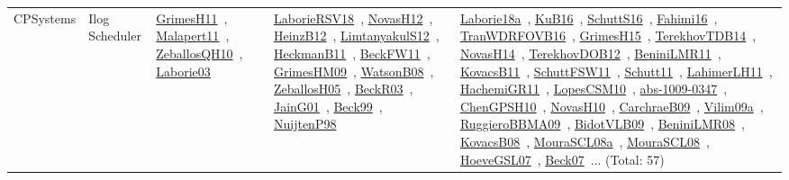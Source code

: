 {\begin{longtable}{lp{3cm}>{\raggedright\arraybackslash}p{6cm}>{\raggedright\arraybackslash}p{6cm}>{\raggedright\arraybackslash}p{8cm}}
CPSystems & Ilog Scheduler & \href{works/GrimesH11.pdf}{GrimesH11}~\cite{GrimesH11}, \href{works/Malapert11.pdf}{Malapert11}~\cite{Malapert11}, \href{works/ZeballosQH10.pdf}{ZeballosQH10}~\cite{ZeballosQH10}, \href{works/Laborie03.pdf}{Laborie03}~\cite{Laborie03} & \href{works/LaborieRSV18.pdf}{LaborieRSV18}~\cite{LaborieRSV18}, \href{works/NovasH12.pdf}{NovasH12}~\cite{NovasH12}, \href{works/HeinzB12.pdf}{HeinzB12}~\cite{HeinzB12}, \href{works/LimtanyakulS12.pdf}{LimtanyakulS12}~\cite{LimtanyakulS12}, \href{works/HeckmanB11.pdf}{HeckmanB11}~\cite{HeckmanB11}, \href{works/BeckFW11.pdf}{BeckFW11}~\cite{BeckFW11}, \href{works/GrimesHM09.pdf}{GrimesHM09}~\cite{GrimesHM09}, \href{works/WatsonB08.pdf}{WatsonB08}~\cite{WatsonB08}, \href{works/ZeballosH05.pdf}{ZeballosH05}~\cite{ZeballosH05}, \href{works/BeckR03.pdf}{BeckR03}~\cite{BeckR03}, \href{works/JainG01.pdf}{JainG01}~\cite{JainG01}, \href{works/Beck99.pdf}{Beck99}~\cite{Beck99}, \href{works/NuijtenP98.pdf}{NuijtenP98}~\cite{NuijtenP98} & \href{works/Laborie18a.pdf}{Laborie18a}~\cite{Laborie18a}, \href{works/KuB16.pdf}{KuB16}~\cite{KuB16}, \href{works/SchuttS16.pdf}{SchuttS16}~\cite{SchuttS16}, \href{works/Fahimi16.pdf}{Fahimi16}~\cite{Fahimi16}, \href{works/TranWDRFOVB16.pdf}{TranWDRFOVB16}~\cite{TranWDRFOVB16}, \href{works/GrimesH15.pdf}{GrimesH15}~\cite{GrimesH15}, \href{works/TerekhovTDB14.pdf}{TerekhovTDB14}~\cite{TerekhovTDB14}, \href{works/NovasH14.pdf}{NovasH14}~\cite{NovasH14}, \href{works/TerekhovDOB12.pdf}{TerekhovDOB12}~\cite{TerekhovDOB12}, \href{works/BeniniLMR11.pdf}{BeniniLMR11}~\cite{BeniniLMR11}, \href{works/KovacsB11.pdf}{KovacsB11}~\cite{KovacsB11}, \href{works/SchuttFSW11.pdf}{SchuttFSW11}~\cite{SchuttFSW11}, \href{works/Schutt11.pdf}{Schutt11}~\cite{Schutt11}, \href{works/LahimerLH11.pdf}{LahimerLH11}~\cite{LahimerLH11}, \href{works/HachemiGR11.pdf}{HachemiGR11}~\cite{HachemiGR11}, \href{works/LopesCSM10.pdf}{LopesCSM10}~\cite{LopesCSM10}, \href{works/abs-1009-0347.pdf}{abs-1009-0347}~\cite{abs-1009-0347}, \href{works/ChenGPSH10.pdf}{ChenGPSH10}~\cite{ChenGPSH10}, \href{works/NovasH10.pdf}{NovasH10}~\cite{NovasH10}, \href{works/CarchraeB09.pdf}{CarchraeB09}~\cite{CarchraeB09}, \href{works/Vilim09a.pdf}{Vilim09a}~\cite{Vilim09a}, \href{works/RuggieroBBMA09.pdf}{RuggieroBBMA09}~\cite{RuggieroBBMA09}, \href{works/BidotVLB09.pdf}{BidotVLB09}~\cite{BidotVLB09}, \href{works/BeniniLMR08.pdf}{BeniniLMR08}~\cite{BeniniLMR08}, \href{works/KovacsB08.pdf}{KovacsB08}~\cite{KovacsB08}, \href{works/MouraSCL08a.pdf}{MouraSCL08a}~\cite{MouraSCL08a}, \href{works/MouraSCL08.pdf}{MouraSCL08}~\cite{MouraSCL08}, \href{works/HoeveGSL07.pdf}{HoeveGSL07}~\cite{HoeveGSL07}, \href{works/Beck07.pdf}{Beck07}~\cite{Beck07}... (Total: 57)\\

\end{longtable}}
